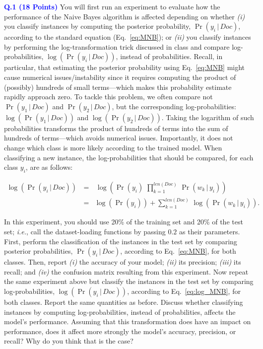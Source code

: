 \documentclass[letterpaper]{article}
\newcommand{\HIGHLIGHT}[1]{\textcolor{blue}{\textbf{#1}}}
\begin{document}
\noindent \HIGHLIGHT{Q.1 (18 Points)} You will first run an experiment to evaluate how the performance of the Naive Bayes algorithm is affected depending on whether \textit{(i)} you classify instances by computing the posterior probability, $\Pr(y_i \, | \, Doc)$, according to the standard equation (Eq.~\eqref{eq:MNB}); or \textit{(ii)} you classify instances by performing the log-transformation trick discussed in class and compare log-probabilities, $\log(\Pr(y_i \, | \, Doc))$, instead of probabilities. Recall, in particular, that estimating the posterior probability using Eq.~\eqref{eq:MNB} might cause numerical issues/instability since it requires computing the product of (possibly) hundreds of small terms---which makes this probability estimate rapidly approach zero. To tackle this problem, we often compare not $\Pr(y_1 \, | \, Doc)$ and $\Pr(y_2 \, | \, Doc)$, but the corresponding log-probabilities: $\log(\Pr(y_1 \, | \, Doc))$ and $\log(\Pr(y_2 \, | \, Doc))$. Taking the logarithm of such probabilities transforms the product of hundreds of terms into the sum of hundreds of terms---which avoids numerical issues. Importantly, it does not change which class is more likely according to the trained model. When classifying a new instance, the log-probabilities that should be compared, for each class $y_i$, are as follows:

\begin{eqnarray}
    \log(\Pr(y_i \, | \, Doc)) \, &=& \, \log\left(\Pr(y_i) \,\, \prod_{k=1}^{len(Doc)} \, \Pr(w_k \, | \, y_i)\right) \\
    &=& \log(\Pr(y_i)) +\sum_{k=1}^{len(Doc)} \, \log(\Pr(w_k \, | \, y_i))  \label{eq:log_MNB}.
\end{eqnarray}

In this experiment, you should use 20\% of the training set and 20\% of the test set; \textit{i.e.}, call the dataset-loading functions by passing $0.2$ as their parameters. First, perform the classification of the instances in the test set by comparing posterior probabilities, $\Pr(y_i \, | \, Doc)$, according to Eq.~\eqref{eq:MNB}, for both  classes. Then, report \textit{(i)} the accuracy of your model; \textit{(ii)} its precision; \textit{(iii)} its recall; and \textit{(iv)} the confusion matrix resulting from this experiment. Now repeat the same experiment above but classify the instances in the test set by comparing log-probabilities, $\log(\Pr(y_i \, | \, Doc))$, according to Eq.~\eqref{eq:log_MNB}, for both classes. Report the same quantities as before. Discuss whether classifying instances by computing log-probabilities, instead of probabilities, affects the model's performance. Assuming that this transformation does have an impact on performance, does it affect more strongly the model's accuracy, precision, or recall? Why do you think that is the case?
%
%
\end{document}
